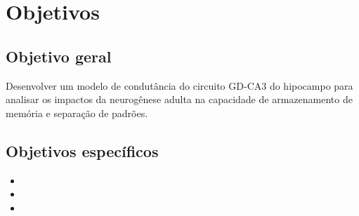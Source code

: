 \chapter{Objetivos}

\section{Objetivo geral}

Desenvolver um modelo de condutância do circuito GD-CA3 do hipocampo para analisar os impactos da neurogênese adulta na capacidade de armazenamento de memória e separação de padrões.

\section{Objetivos específicos}

\begin{itemize}
    \item 
    \item 
    \item 
\end{itemize}
